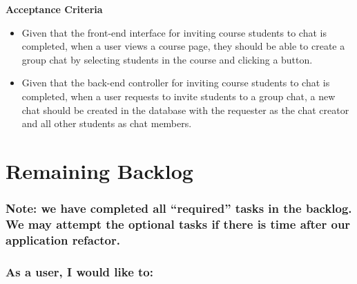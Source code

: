 \documentclass[12pt]{article}
\newcommand{\brbig}{\vspace{4mm}}
\begin{document}
\brbig

\textbf{Acceptance Criteria}
\begin{itemize}[nolistsep]
\item Given that the front-end interface for inviting course students to chat is completed, when a user views a course page, they should be able to create a group chat by selecting students in the course and clicking a button.
\item Given that the back-end controller for inviting course students to chat is completed, when a user requests to invite students to a group chat, a new chat should be created in the database with the requester as the chat creator and all other students as chat members.
\end{itemize}

\section{Remaining Backlog}

\subsubsection*{Note: we have completed all ``required'' tasks in the backlog. We may attempt the optional tasks if there is time after our application refactor.}

\subsubsection*{As a user, I would like to:}
\end{document}
